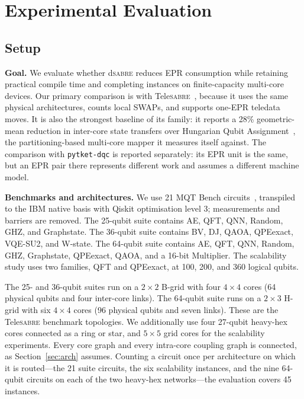 \documentclass[journal]{IEEEtran}
\newcommand{\dSABRE}{d\textsc{sabre}}
\newcommand{\TeleSABRE}{Tele\textsc{sabre}}
\begin{document}
\section{Experimental Evaluation}
\label{sec:experiments}

\subsection{Setup}
\label{sec:setup}

\textbf{Goal.} We evaluate whether \dSABRE{} reduces EPR consumption while retaining practical compile time and completing instances on finite-capacity multi-core devices.  Our primary comparison is with \TeleSABRE{}~\cite{russo2025telesabre}, because it uses the same physical architectures, counts local SWAPs, and supports one-EPR teledata moves.  It is also the strongest baseline of its family: it reports a 28\% geometric-mean reduction in inter-core state transfers over Hungarian Qubit Assignment~\cite{escofet2023hqa,escofet2024review}, the partitioning-based multi-core mapper it measures itself against.  The comparison with \texttt{pytket-dqc} is reported separately: its EPR unit is the same, but an EPR pair there represents different work and assumes a different machine model.

\textbf{Benchmarks and architectures.} We use 21 MQT Bench circuits~\cite{quetschlich2023mqtbench}, transpiled to the IBM native basis with Qiskit optimisation level 3; measurements and barriers are removed.  The 25-qubit suite contains AE, QFT, QNN, Random, GHZ, and Graphstate.  The 36-qubit suite contains BV, DJ, QAOA, QPEexact, VQE-SU2, and W-state.  The 64-qubit suite contains AE, QFT, QNN, Random, GHZ, Graphstate, QPEexact, QAOA, and a 16-bit Multiplier.  The scalability study uses two families, QFT and QPEexact, at 100, 200, and 360 logical qubits.

The 25- and 36-qubit suites run on a $2\times2$ B-grid with four $4\times4$ cores (64 physical qubits and four inter-core links).  The 64-qubit suite runs on a $2\times3$ H-grid with six $4\times4$ cores (96 physical qubits and seven links).  These are the \TeleSABRE{} benchmark topologies.  We additionally use four 27-qubit heavy-hex cores connected as a ring or star, and $5\times5$ grid cores for the scalability experiments.  Every core graph and every intra-core coupling graph is connected, as Section~\ref{sec:arch} assumes.  Counting a circuit once per architecture on which it is routed---the 21 suite circuits, the six scalability instances, and the nine 64-qubit circuits on each of the two heavy-hex networks---the evaluation covers 45 instances.
\end{document}
